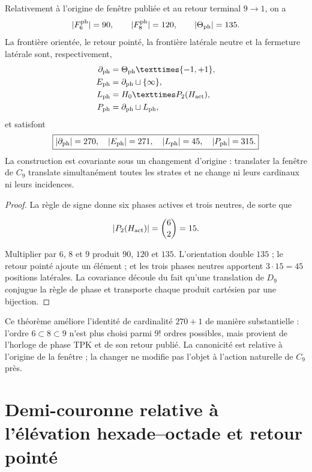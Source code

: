 \begin{theorem}
\label{thm:semicorona-fase-tpk}
Relativement à l'origine de fenêtre publiée et au retour terminal
\(9\to1\), on a
\[
 |\mathcal F^{\rm ph}_6|=90,
 \qquad
 |\mathcal F^{\rm ph}_8|=120,
 \qquad
 |\Theta_{\rm ph}|=135.
\]
La frontière orientée, le retour pointé, la frontière latérale neutre et la
fermeture latérale sont, respectivement,
\[
\begin{aligned}
 \partial_{\rm ph}&=\Theta_{\rm ph}\times\{-1,+1\},\\
 E_{\rm ph}&=\partial_{\rm ph}\sqcup\{\infty\},\\
 L_{\rm ph}&=H_0\times P_2(H_{\rm act}),\\
 P_{\rm ph}&=\partial_{\rm ph}\sqcup L_{\rm ph},
\end{aligned}
\]
et satisfont
\[
 \boxed{|\partial_{\rm ph}|=270,\quad
 |E_{\rm ph}|=271,\quad |L_{\rm ph}|=45,\quad
 |P_{\rm ph}|=315.}
\]
La construction est covariante sous un changement d'origine : translater la fenêtre
de \(C_9\) translate simultanément toutes les strates et ne change ni leurs
cardinaux ni leurs incidences.
\end{theorem}

\begin{proof}
La règle de signe donne six phases actives et trois neutres, de sorte que

\[
 |P_2(H_{\rm act})|=\binom62=15.
\]

Multiplier par \(6\), \(8\) et \(9\) produit \(90\), \(120\) et \(135\).
L'orientation double \(135\) ; le retour pointé ajoute un élément ; et les
trois phases neutres apportent \(3\cdot15=45\) positions latérales. La
covariance découle du fait qu'une translation de \(D_9\) conjugue la règle de phase
et transporte chaque produit cartésien par une bijection.
\end{proof}

Ce théorème améliore l'identité de cardinalité \(270+1\) de manière substantielle :
l'ordre \(6\subset8\subset9\) n'est plus choisi parmi \(9!\) ordres possibles,
mais provient de l'horloge de phase TPK et de son retour publié. La
canonicité est relative à l'origine de la fenêtre ; la changer ne modifie pas
l'objet à l'action naturelle de \(C_9\) près.

\section{Demi-couronne relative à l'élévation
hexade--octade et retour pointé}

